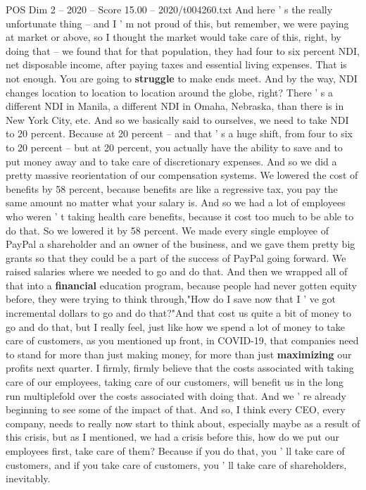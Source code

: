 \begin{textsample}{POS Dim 2 – 2020 – Score 15.00 – 2020/t004260.txt}
And here ' s the really unfortunate thing -- and I ' m not proud of this, but remember, we were paying at market or above, so I thought the market would take care of this, right, by doing that -- we found that for that population, they had four to six percent NDI, net disposable income, after paying taxes and essential living expenses.
That is not enough.
You are going to \textbf{struggle} to make ends meet.
And by the way, NDI changes location to location to location around the globe, right?
There ' s a different NDI in Manila, a different NDI in Omaha, Nebraska, than there is in New York City, etc.
And so we basically said to ourselves, we need to take NDI to 20 percent.
Because at 20 percent -- and that ' s a huge shift, from four to six to 20 percent -- but at 20 percent, you actually have the ability to save and to put money away and to take care of discretionary expenses.
And so we did a pretty massive reorientation of our compensation systems.
We lowered the cost of benefits by 58 percent, because benefits are like a regressive tax, you pay the same amount no matter what your salary is.
And so we had a lot of employees who weren ' t taking health care benefits, because it cost too much to be able to do that.
So we lowered it by 58 percent.
We made every single employee of PayPal a shareholder and an owner of the business, and we gave them pretty big grants so that they could be a part of the success of PayPal going forward.
We raised salaries where we needed to go and do that.
And then we wrapped all of that into a \textbf{financial} education program, because people had never gotten equity before, they were trying to think through,"How do I save now that I ' ve got incremental dollars to go and do that?"And that cost us quite a bit of money to go and do that, but I really feel, just like how we spend a lot of money to take care of customers, as you mentioned up front, in COVID-19, that companies need to stand for more than just making money, for more than just \textbf{maximizing} our profits next quarter.
I firmly, firmly believe that the costs associated with taking care of our employees, taking care of our customers, will benefit us in the long run multiplefold over the costs associated with doing that.
And we ' re already beginning to see some of the impact of that.
And so, I think every CEO, every company, needs to really now start to think about, especially maybe as a result of this crisis, but as I mentioned, we had a crisis before this, how do we put our employees first, take care of them?
Because if you do that, you ' ll take care of customers, and if you take care of customers, you ' ll take care of shareholders, inevitably.

\end{textsample}
